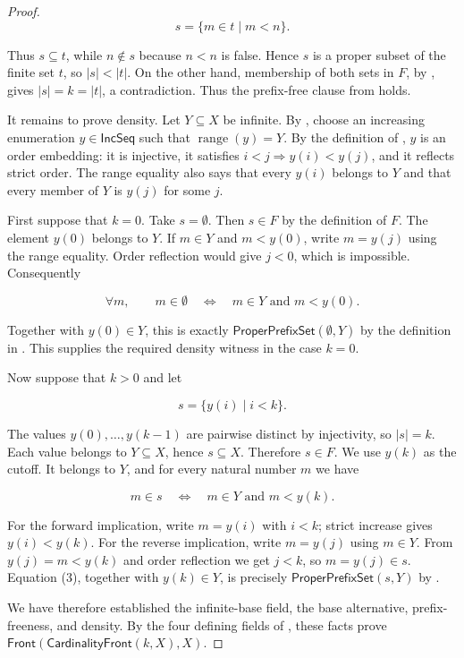 \begin{proof}
\[
s=\{m\in t\mid m<n\}.
\]

Thus $s\subseteq t$, while $n\notin s$ because $n<n$ is false.  Hence
$s$ is a proper subset of the finite set $t$, so $|s|<|t|$.  On the
other hand, membership of both sets in $F$, by
, gives $|s|=k=|t|$, a contradiction.  Thus
the prefix-free clause from  holds.

It remains to prove density.  Let $Y\subseteq X$ be infinite.  By
, choose an increasing enumeration
$y\in\mathsf{IncSeq}$ such that
$\operatorname{range}(y)=Y$.  By the definition of ,
$y$ is an order embedding: it is injective, it satisfies
$i<j\Rightarrow y(i)<y(j)$, and it reflects strict order.  The range
equality also says that every $y(i)$ belongs to $Y$ and that every member
of $Y$ is $y(j)$ for some $j$.

First suppose that $k=0$.  Take $s=\emptyset$.  Then $s\in F$ by the
definition of $F$.  The element $y(0)$ belongs to $Y$.  If $m\in Y$ and
$m<y(0)$, write $m=y(j)$ using the range equality.  Order reflection
would give $j<0$, which is impossible.  Consequently

\[
\forall m,\qquad m\in\emptyset
\quad\Longleftrightarrow\quad m\in Y\text{ and }m<y(0).
\]

Together with $y(0)\in Y$, this is exactly
$\mathsf{ProperPrefixSet}(\emptyset,Y)$ by the definition in
.  This supplies the required density witness in
the case $k=0$.

Now suppose that $k>0$ and let

\[
s=\{y(i)\mid i<k\}.
\]

The values $y(0),\ldots,y(k-1)$ are pairwise distinct by injectivity, so
$|s|=k$.  Each value belongs to $Y\subseteq X$, hence $s\subseteq X$.
Therefore $s\in F$.  We use $y(k)$ as the cutoff.  It belongs to $Y$,
and for every natural number $m$ we have

\[
m\in s
\quad\Longleftrightarrow\quad m\in Y\text{ and }m<y(k).
\tag{3}
\]

For the forward implication, write $m=y(i)$ with $i<k$; strict increase
gives $y(i)<y(k)$.  For the reverse implication, write $m=y(j)$ using
$m\in Y$.  From $y(j)=m<y(k)$ and order reflection we get $j<k$, so
$m=y(j)\in s$.  Equation (3), together with $y(k)\in Y$, is precisely
$\mathsf{ProperPrefixSet}(s,Y)$ by .

We have therefore established the infinite-base field, the base
alternative, prefix-freeness, and density.  By the four defining fields
of , these facts prove
$\mathsf{Front}(\mathsf{CardinalityFront}(k,X),X)$.
\end{proof}
